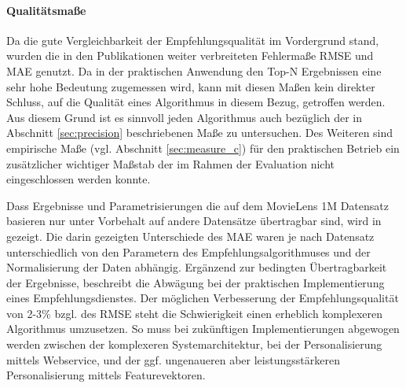\paragraph{Qualitätsmaße} Da die gute Vergleichbarkeit der Empfehlungsqualität im Vordergrund stand, wurden die in den Publikationen weiter verbreiteten Fehlermaße \acs{RMSE} und \acs{MAE} genutzt. Da in der praktischen Anwendung den Top-N Ergebnissen eine sehr hohe Bedeutung zugemessen wird, kann mit diesen Maßen kein direkter Schluss, auf die Qualität eines Algorithmus in diesem Bezug, getroffen werden. Aus diesem Grund ist es sinnvoll jeden Algorithmus auch bezüglich der in Abschnitt \ref{sec:precision} beschriebenen Maße zu untersuchen. Des Weiteren sind empirische Maße (vgl. Abschnitt \ref{sec:measure_c}) für den praktischen Betrieb ein zusätzlicher wichtiger Maßstab der im Rahmen der Evaluation nicht eingeschlossen werden konnte. \citep{Cremonesi:2010:PRA:1864708.1864721}

Dass Ergebnisse und Parametrisierungen die auf dem MovieLens 1M Datensatz basieren nur unter Vorbehalt auf andere Datensätze übertragbar sind, wird in \citep{Howe08} gezeigt. Die darin gezeigten Unterschiede des \acs{MAE} waren je nach Datensatz unterschiedlich von den Parametern des Empfehlungsalgorithmuses und der Normalisierung der Daten abhängig. Ergänzend zur bedingten Übertragbarkeit der Ergebnisse, beschreibt \citep{netflix2012_2} die Abwägung bei der praktischen Implementierung eines Empfehlungsdienstes. Der möglichen Verbesserung der Empfehlungsqualität von 2-3\% bzgl. des \acs{RMSE} steht die 
Schwierigkeit einen erheblich komplexeren Algorithmus umzusetzen. So muss bei zukünftigen Implementierungen abgewogen werden zwischen der komplexeren Systemarchitektur, bei der Personalisierung mittels  Webservice, und der ggf. ungenaueren aber leistungsstärkeren Personalisierung mittels Featurevektoren.

